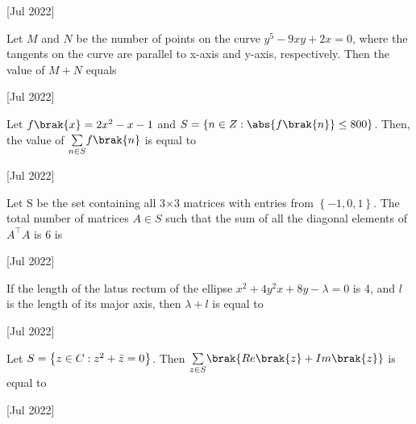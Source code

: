     \hfill[Jul 2022]
        
    \item Let $M$ and $N$ be the number of points on the curve $y^5-9xy+2x=0$, where the tangents on the curve are parallel to x-axis and y-axis, respectively. Then the value of $M+N$ equals
    
    \hfill[Jul 2022]

    \item Let $f\brak{x}=2x^2-x-1$ and $S=\left\{ n\in Z:\abs{f\brak{n}}\leq800 \right\}$. Then, the value of $\underset{n\in S}{\sum}f\brak{n}$ is equal to
    
    \hfill[Jul 2022]
        
    \item Let S be the set containing all 3$\times$3 matrices with entries from $\left\{ -1,0,1 \right\}$. The total number of matrices $A\in S$ such that the sum of all the diagonal elements of $A^\top A$ is 6 is
    
    \hfill[Jul 2022]

    \item If the length of the latus rectum of the ellipse $x^2+4y^2x+8y-\lambda=0$ is 4, and $l$ is the length of its major axis, then $\lambda+l$ is equal to
    
    \hfill[Jul 2022]

    \item Let $S=\left\{ z\in C:z^2+\Bar{z}=0 \right\}$. Then $\underset{z\in S}{\sum}\brak{Re\brak{z}+Im\brak{z}}$ is equal to
    
    \hfill[Jul 2022]

